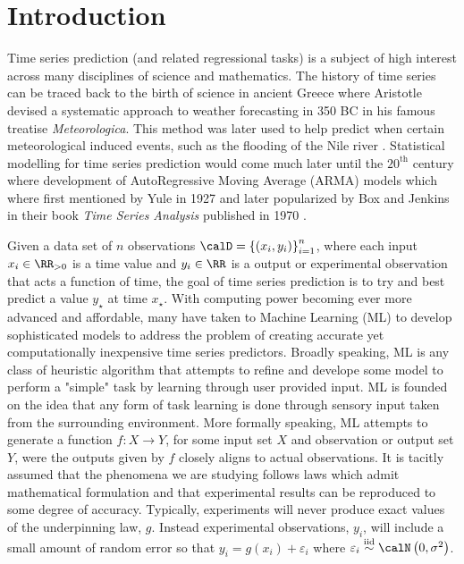 \section*{Introduction}
Time series prediction (and related regressional tasks) is a subject of high interest across many disciplines of science and mathematics. The history of time series can be traced back to the birth of science in ancient Greece where Aristotle devised a systematic approach to weather forecasting in 350 BC in his famous treatise {\it Meteorologica}. This method was later used to help predict when certain meteorological induced events, such as the flooding of the Nile river \cite{10.2307/26254645}. Statistical modelling for time series prediction would come much later until the $20^{\text{th}}$ century where development of AutoRegressive Moving Average (ARMA) models which where first mentioned by Yule \cite{YuleG.Udny1927OaMo} in 1927 and later popularized by Box and Jenkins in their book {\it Time Series Analysis} published in 1970 \cite{BoxGeorgeE.P.2008Tsa:}.

Given a data set of $n$ observations $\calD = \left\{ \left( x_i , y_i \right) \right\}_{i=1}^{n}$, where each input $x_i \in \RR_{>0}$ is a time value and $y_i \in \RR$ is a output or experimental observation that acts a function of time, the goal of time series prediction is to try and best predict a value $y_{\star}$ at time $x_{\star}$. With computing power becoming ever more advanced and affordable, many have taken to Machine Learning (ML) to develop sophisticated models to address the problem of creating accurate yet computationally inexpensive time series predictors. Broadly speaking, ML is any class of heuristic algorithm that attempts to refine and develope some model to perform a "simple" task by learning through user provided input. ML is founded on the idea that any form of task learning is done through sensory input taken from the surrounding environment. More formally speaking, ML attempts to generate a function $f : X \to Y$, for some input set $X$ and observation or output set $Y$, were the outputs given by $f$ closely aligns to actual observations. It is tacitly assumed  that the phenomena we are studying follows laws which admit mathematical formulation and that experimental results can be reproduced to some degree of accuracy. Typically, experiments will never produce exact values of the underpinning law, $g$. Instead experimental observations, $y_i$, will include a small amount of random error so that $y_i =  g(x_i) + \varepsilon_i$ where $\varepsilon_i \overset{\text{iid}}{\sim} \calN \left( 0, \sigma^2 \right)$.

